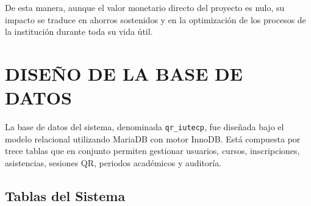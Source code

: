 \documentclass[12pt, letterpaper, oneside]{report}
\begin{document}
De esta manera, aunque el valor monetario directo del proyecto es nulo, su impacto se traduce en ahorros sostenidos y en la optimizaci\'on de los procesos de la instituci\'on durante toda su vida \'util.

\newpage

\chapter{DISE\~NO DE LA BASE DE DATOS}

La base de datos del sistema, denominada \texttt{qr\_iutecp}, fue dise\~nada bajo el modelo relacional utilizando MariaDB con motor InnoDB. Est\'a compuesta por trece tablas que en conjunto permiten gestionar usuarios, cursos, inscripciones, asistencias, sesiones QR, periodos acad\'emicos y auditor\'ia.

\section{Tablas del Sistema}
\end{document}
